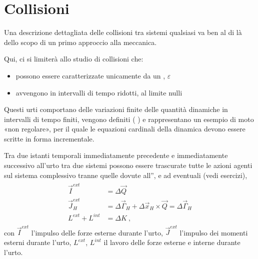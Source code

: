 \documentclass[letterpaper,10pt,italian]{jupyterBook}
\begin{document}
\sphinxstepscope


\section{Collisioni}
\label{\detokenize{ch/mechanics/dynamics-collisions:collisioni}}\label{\detokenize{ch/mechanics/dynamics-collisions:physics-hs-mechanics-dynamics-collisions}}\label{\detokenize{ch/mechanics/dynamics-collisions::doc}}
\sphinxAtStartPar
Una descrizione dettagliata delle collisioni tra sistemi qualsiasi va ben al di là dello scopo di un primo approccio alla meccanica.

\sphinxAtStartPar
Qui, ci si limiterà allo studio di collisioni che:
\begin{itemize}
\item {} 
\sphinxAtStartPar
possono essere caratterizzate unicamente da un , \(\varepsilon\) 

\item {} 
\sphinxAtStartPar
avvengono in intervalli di tempo ridotti, al limite nulli

\end{itemize}

\sphinxAtStartPar
Questi urti comportano delle variazioni finite delle quantità dinamiche in intervalli di tempo finiti, vengono definiti  ( ) e  rappresentano un esempio di moto «non regolare», per il quale le equazioni cardinali della dinamica devono essere scritte in forma incrementale.

\sphinxAtStartPar
{} 

\sphinxAtStartPar
Tra due istanti temporali immediatamente precedente e immediatamente successivo all’urto tra due sistemi possono essere trascurate tutte le azioni agenti sul sistema complessivo tranne quelle  dovute all”, e ad eventuali  (vedi esercizi),
\begin{equation*}
\begin{split}\begin{aligned}
  \vec{I}^{ext}   & = \Delta \vec{Q} \\
  \vec{J}_H^{ext} & = \Delta \vec{\Gamma}_H + \Delta \vec{x}_H \times \vec{Q} = \Delta \vec{\Gamma}_{H} \\
  L^{ext} + L^{int} & = \Delta K \ ,
\end{aligned}\end{split}
\end{equation*}
\sphinxAtStartPar
con \(\vec{I}^{ext}\) l’impulso delle forze esterne durante l’urto, \(\vec{J}^{ext}\) l’impulso dei momenti esterni durante l’urto, \(L^{ext}\), \(L^{int}\) il lavoro delle forze esterne e interne durante l’urto.
\end{document}
